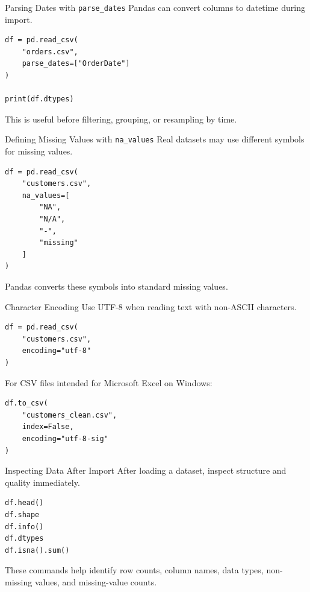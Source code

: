 \documentclass[aspectratio=169,11pt]{beamer}
\newcommand{\code}[1]{\texttt{#1}}
\begin{document}
\begin{frame}[fragile]{Parsing Dates with \code{parse\_dates}}
Pandas can convert columns to datetime during import.

\begin{lstlisting}[style=pythonstyle]
df = pd.read_csv(
    "orders.csv",
    parse_dates=["OrderDate"]
)

print(df.dtypes)
\end{lstlisting}

This is useful before filtering, grouping, or resampling by time.
\end{frame}

\begin{frame}[fragile]{Defining Missing Values with \code{na\_values}}
Real datasets may use different symbols for missing values.

\begin{lstlisting}[style=pythonstyle]
df = pd.read_csv(
    "customers.csv",
    na_values=[
        "NA",
        "N/A",
        "-",
        "missing"
    ]
)
\end{lstlisting}

Pandas converts these symbols into standard missing values.
\end{frame}

\begin{frame}[fragile]{Character Encoding}
Use UTF-8 when reading text with non-ASCII characters.

\begin{lstlisting}[style=pythonstyle]
df = pd.read_csv(
    "customers.csv",
    encoding="utf-8"
)
\end{lstlisting}

For CSV files intended for Microsoft Excel on Windows:
\begin{lstlisting}[style=pythonstyle]
df.to_csv(
    "customers_clean.csv",
    index=False,
    encoding="utf-8-sig"
)
\end{lstlisting}
\end{frame}

\begin{frame}[fragile]{Inspecting Data After Import}
After loading a dataset, inspect structure and quality immediately.

\begin{lstlisting}[style=pythonstyle]
df.head()
df.shape
df.info()
df.dtypes
df.isna().sum()
\end{lstlisting}

These commands help identify row counts, column names, data types, non-missing values, and missing-value counts.
\end{frame}
\end{document}

